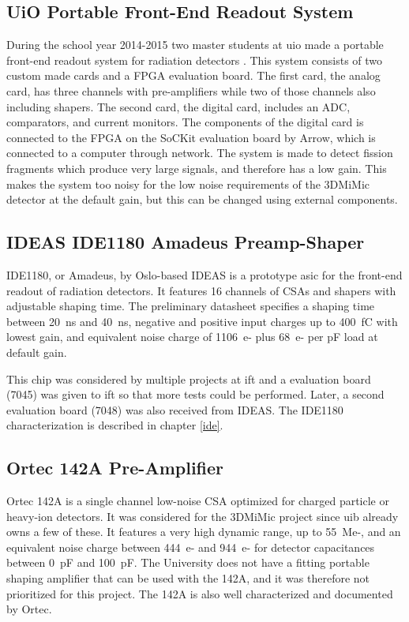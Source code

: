 \documentclass[../main/thesis.tex]{subfiles}
\begin{document}
\subsection{UiO Portable Front-End Readout System}
\label{e-uio}
During the school year 2014-2015 two master students at \gls{uio} made a portable front-end readout system for radiation detectors \citep{tali} \citep{oltedal}. This system consists of two custom made cards and a \gls{FPGA} evaluation board. The first card, the analog card, has three channels with pre-amplifiers while two of those channels also including shapers. The second card, the digital card, includes an \gls{ADC}, comparators, and current monitors. The components of the digital card is connected to the \gls{FPGA} on the SoCKit evaluation board by Arrow, which is connected to a computer through network. The system is made to detect fission fragments which produce very large signals, and therefore has a low gain. This makes the system too noisy for the low noise requirements of the 3DMiMic detector at the default gain, but this can be changed using external components.

\subsection{IDEAS IDE1180 Amadeus Preamp-Shaper}
\label{e-ide1180}
IDE1180, or Amadeus, by Oslo-based IDEAS is a prototype \gls{asic} for the front-end readout of radiation detectors. It features 16 channels of \gls{CSA}s and shapers with adjustable shaping time. The preliminary datasheet \citep{IDE1180} specifies a shaping time between 20~ns and 40~ns, negative and positive input charges up to 400~fC with lowest gain, and equivalent noise charge of 1106~e- plus 68~e- per pF load at default gain. 

This chip was considered by multiple projects at \gls{ift} and a evaluation board (7045) was given to \gls{ift} so that more tests could be performed. Later, a second evaluation board (7048) was also received from IDEAS. The IDE1180 characterization is described in chapter \ref{ide}. 

\subsection{Ortec 142A Pre-Amplifier}
\label{e-ortec}
Ortec 142A is a single channel low-noise \gls{CSA} optimized for charged particle or heavy-ion detectors. It was considered for the 3DMiMic project since \gls{uib} already owns a few of these. It features a very high dynamic range, up to 55~Me-, and an equivalent noise charge between 444~e- and 944~e- for detector capacitances between 0~pF and 100~pF. The University does not have a fitting portable shaping amplifier that can be used with the 142A, and it was therefore not prioritized for this project. The 142A is also well characterized and documented by Ortec. \citep{Ortecdata}
\end{document}
